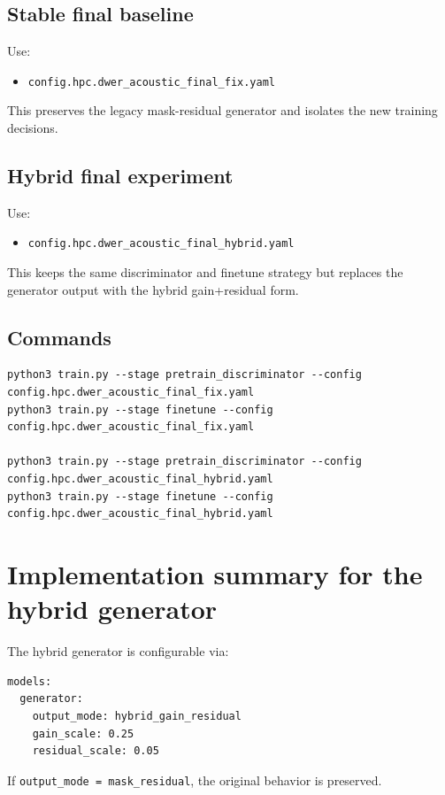 \documentclass[11pt]{article}
\begin{document}
\subsection{Stable final baseline}
Use:
\begin{itemize}[leftmargin=*]
    \item \texttt{config.hpc.dwer\_acoustic\_final\_fix.yaml}
\end{itemize}
This preserves the legacy mask-residual generator and isolates the new training decisions.

\subsection{Hybrid final experiment}
Use:
\begin{itemize}[leftmargin=*]
    \item \texttt{config.hpc.dwer\_acoustic\_final\_hybrid.yaml}
\end{itemize}
This keeps the same discriminator and finetune strategy but replaces the generator output with the hybrid gain+residual form.

\subsection{Commands}
\begin{lstlisting}[basicstyle=\ttfamily\small,breaklines=true]
python3 train.py --stage pretrain_discriminator --config config.hpc.dwer_acoustic_final_fix.yaml
python3 train.py --stage finetune --config config.hpc.dwer_acoustic_final_fix.yaml

python3 train.py --stage pretrain_discriminator --config config.hpc.dwer_acoustic_final_hybrid.yaml
python3 train.py --stage finetune --config config.hpc.dwer_acoustic_final_hybrid.yaml
\end{lstlisting}

\section{Implementation summary for the hybrid generator}
The hybrid generator is configurable via:
\begin{lstlisting}[basicstyle=\ttfamily\small,breaklines=true]
models:
  generator:
    output_mode: hybrid_gain_residual
    gain_scale: 0.25
    residual_scale: 0.05
\end{lstlisting}

If \texttt{output\_mode = mask\_residual}, the original behavior is preserved.
\end{document}
